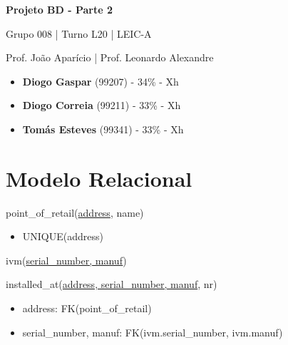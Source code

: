 \documentclass[12pt,a4paper]{article}
\begin{document}
  \begin{titlepage}
    \begin{center}
      \vspace*{5cm}
    
      \Huge
      \textbf{Projeto BD - Parte 2}

      \vspace{0.5cm}
      \LARGE
      Grupo 008 | Turno L20 | LEIC-A

      \vspace{0.5cm}
      \large
      Prof. João Aparício | Prof. Leonardo Alexandre

      \vfill
    \end{center}
    \large
    \begin{itemize}
      \item[] \textbf{Diogo Gaspar} (99207) - 34\% - Xh
      \item[] \textbf{Diogo Correia} (99211) - 33\% - Xh
      \item[] \textbf{Tomás Esteves} (99341) - 33\% - Xh
    \end{itemize}
  \end{titlepage}

  \section*{Modelo Relacional}

  \ttfamily

  \noindent
  point\_of\_retail(\underline{address}, name)
  \begin{itemize}[nosep]
    \item UNIQUE(address)
  \end{itemize}
  
  \vspace*{10pt}

  \noindent
  ivm(\underline{serial\_number, manuf})

  \vspace*{10pt}

  \noindent
  installed\_at(\underline{address, serial\_number, manuf}, nr)
  \begin{itemize}[nosep]
    \item address: FK(point\_of\_retail)
    \item serial\_number, manuf: FK(ivm.serial\_number, ivm.manuf)
  \end{itemize}
  
  \vspace*{10pt}
  
\end{document}
